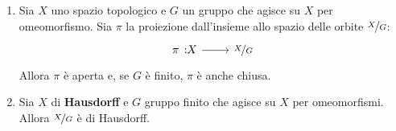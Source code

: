 \begin{proposition} \label{proiezione azione gruppo aperta}
\begin{enumerate}
\item Sia $X$ uno spazio topologico e $G$ un gruppo che agisce su $X$ per omeomorfismo. Sia $\pi$ la proiezione dall'insieme allo spazio delle orbite $\nicefrac{X}{G}$:
	\begin{equation}
		\funz{\pi}{X}{\nicefrac{X}{G}}
	\end{equation}
Allora $\pi$ è aperta e, se $G$ è finito, $\pi$ è anche chiusa.
\item Sia $X$ di \textbf{Hausdorff} e $G$ gruppo finito che agisce su $X$ per omeomorfismi. Allora $\nicefrac{X}{G}$ è di Hausdorff.
\end{enumerate}
\vspace{-3mm}
\end{proposition}

